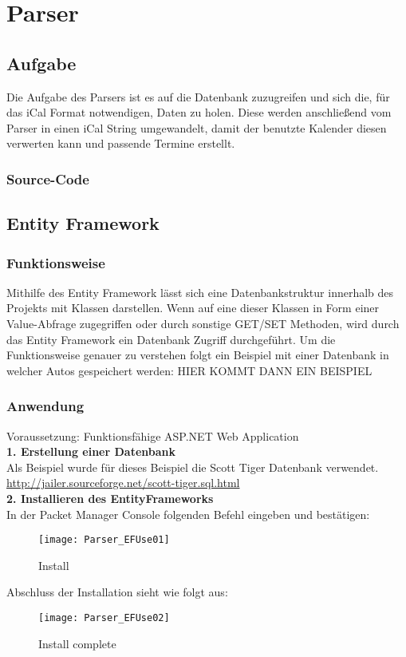 \renewcommand{\theauthor}{Dario Wagner}
\justifying
\section{Parser}
\label{sec:parser}
\subsection{Aufgabe}
\label{sec:parser-aufgabe}
Die Aufgabe des Parsers ist es auf die Datenbank zuzugreifen und sich die, für das iCal Format notwendigen, Daten zu holen. Diese werden anschließend vom Parser in einen iCal String umgewandelt, damit der benutzte Kalender diesen verwerten kann und passende Termine erstellt. 

\subsubsection{Source-Code}

\subsection{Entity Framework}
\label{sec:parser-entity-framework}
\subsubsection {Funktionsweise}
Mithilfe des Entity Framework lässt sich eine Datenbankstruktur innerhalb des Projekts mit Klassen darstellen. Wenn auf eine dieser Klassen in Form einer Value-Abfrage zugegriffen oder durch sonstige GET/SET Methoden, wird durch das Entity Framework ein Datenbank Zugriff durchgeführt. 
Um die Funktionsweise genauer zu verstehen folgt ein Beispiel mit einer Datenbank in welcher Autos gespeichert werden:
HIER KOMMT DANN EIN BEISPIEL
\subsubsection {Anwendung}
Voraussetzung: Funktionsfähige ASP.NET Web Application \\
\break \textbf{1. Erstellung einer Datenbank} \\
Als Beispiel wurde für dieses Beispiel die Scott Tiger Datenbank verwendet.
\break \url{http://jailer.sourceforge.net/scott-tiger.sql.html} \\
\break \textbf{2. Installieren des EntityFrameworks} \\
In der Packet Manager Console folgenden Befehl eingeben und bestätigen: 
\begin{figure}[H]
    \centering
    \texttt{[image: Parser\_EFUse01]}
    \caption{Install}
    \label{fig:parsef01}
\end{figure}
Abschluss der Installation sieht wie folgt aus:
\begin{figure}[H]
    \centering
    \texttt{[image: Parser\_EFUse02]}
    \caption{Install complete}
    \label{fig:parsef02}
\end{figure} 


